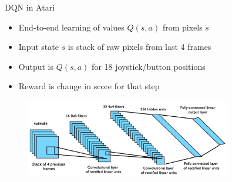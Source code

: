 \bgroup
\begin{frame}{DQN in Atari}
\begin{itemize}
\item End-to-end learning of values $Q(s, a)$ from pixels $s$
\item Input state $s$ is stack of raw pixels from last 4 frames
\item Output is $Q(s, a)$ for 18 joystick/button positions
\item Reward is change in score for that step
\end{itemize}
\begin{figure}
\centering
\includegraphics[width=0.8\textwidth]{img/dqn.jpg}
\end{figure}
\end{frame}
\egroup